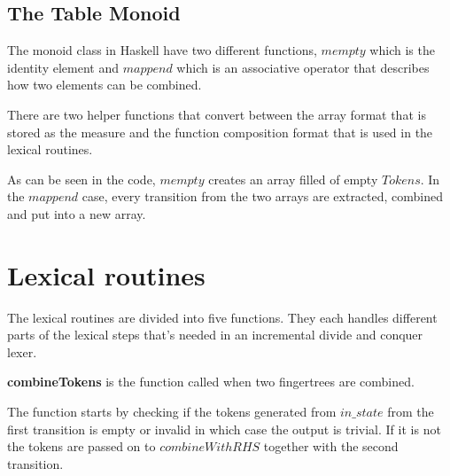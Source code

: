 \subsection{The Table Monoid}
The monoid class in Haskell have two different functions, $mempty$ which is the
identity element and $mappend$ which is an associative operator that describes how
two elements can be combined.

There are two helper functions that convert between the array format that is
stored as the measure and the function composition format that is used in the
lexical routines.

As can be seen in the code, $mempty$ creates an array filled of empty $Tokens$.
In the $mappend$ case, every transition from the two arrays are extracted,
combined and put into a new array.

\section{Lexical routines}
The lexical routines are divided into five functions. They each handles
different parts of the lexical steps that's needed in an incremental divide and
conquer lexer.


\textbf{combineTokens} is the function called when two fingertrees are combined.

The function starts by checking if the tokens generated from $in\_state$ from
the first transition is empty or invalid in which case the output is trivial. If
it is not the tokens are passed on to $combineWithRHS$ together with the second
transition.

